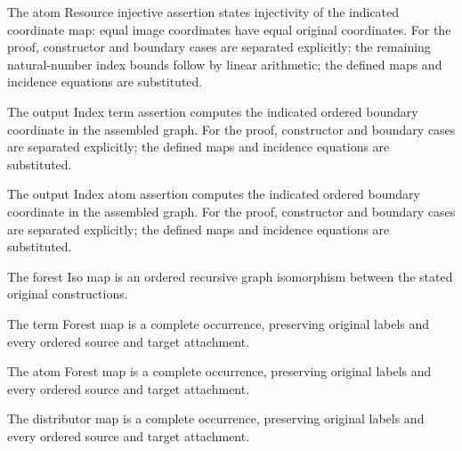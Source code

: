 The atom Resource injective assertion states injectivity of the indicated coordinate map: equal image coordinates have equal original coordinates.
For the proof, constructor and boundary cases are separated explicitly; the remaining natural-number index bounds follow by linear arithmetic; the defined maps and incidence equations are substituted.
\par{}

The output Index term assertion computes the indicated ordered boundary coordinate in the assembled graph.
For the proof, constructor and boundary cases are separated explicitly; the defined maps and incidence equations are substituted.
\par{}

The output Index atom assertion computes the indicated ordered boundary coordinate in the assembled graph.
For the proof, constructor and boundary cases are separated explicitly; the defined maps and incidence equations are substituted.
\par{}

The forest Iso map is an ordered recursive graph isomorphism between the stated original constructions.
\par{}

The term Forest map is a complete occurrence, preserving original labels and every ordered source and target attachment.
\par{}

The atom Forest map is a complete occurrence, preserving original labels and every ordered source and target attachment.
\par{}

The distributor map is a complete occurrence, preserving original labels and every ordered source and target attachment.
\par{}

